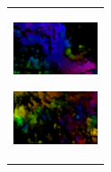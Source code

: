 \begin{figure}[htbp]
\begin{tabular}{l}
\begin{minipage}{0.165\hsize}
        \begin{center}
          \includegraphics[clip, width=2.5cm]{./Figures/optic_run4.eps}
          \hspace{0.1cm} { }
        \end{center}
      \end{minipage}
      \begin{minipage}{0.165\hsize}
        \begin{center}
          \includegraphics[clip, width=2.5cm]{./Figures/optic_run5.eps}
          \hspace{2.2cm} { }
        \end{center}
      \end{minipage}
\\ %


\end{tabular}
\end{figure}
